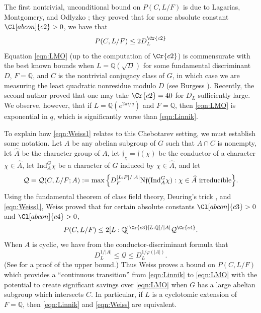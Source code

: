 \documentclass[12pt,psamsfonts]{amsart}
\theoremstyle{definition}
\theoremstyle{remark}
\numberwithin{equation}{section}
\newcounter{notation}
\theoremstyle{plain}
\theoremstyle{remark}
\renewcommand{\1}{ {\bf 1}}
\newcommand{\kf}{\mathfrak{f}}
\begin{document}
The first nontrivial, unconditional bound on $P(C,L/F)$ is due to Lagarias, Montgomery, and Odlyzko \cite{LMO}; they proved that for some absolute constant $\Cl[abcon]{c2}>0$, we have that
\begin{equation}
\label{eqn:LMO}
P(C,L/F)\leq 2D_L^{\Cr{c2}}
\end{equation}
Equation \eqref{eqn:LMO} (up to the computation of $\Cr{c2}$) is commensurate with the best known bounds when $L=\mathbb{Q}(\sqrt{D})$ for some fundamental discriminant $D$, $F=\mathbb{Q}$, and $C$ is the nontrivial conjugacy class of $G$, in which case we are measuring the least quadratic nonresidue modulo $D$ (see Burgess \cite{Burgess}).  %
Recently, the second author \cite{Zaman_2015c} proved that one may take $\Cr{c2}=40$ for $D_L$ sufficiently large.  We observe, however, that if $L=\mathbb{Q}(e^{2\pi i/q})$ and $F=\mathbb{Q}$, then \eqref{eqn:LMO} is exponential in $q$, which is significantly worse than \eqref{eqn:Linnik}.

To explain how \eqref{eqn:Weiss1} relates to this Chebotarev setting, we must establish some notation.  Let $A$ be any abelian subgroup of $G$ such that $A\cap C$ is nonempty, let $\widehat{A}$ be the character group of $A$, let $\kf_{\chi} = \mathfrak{f}(\chi)$ be the conductor of a character $\chi\in\widehat{A}$, let $\mathrm{Ind}_A^G \chi$ be a character of $\widehat{G}$ induced by $\chi\in\widehat{A}$, and let
\[
\mathcal{Q}=\mathcal{Q}(C,L/F;A):=\max\Big\{D_F^{[L:F]/|A|}\mathrm{N}\mathfrak{f}(\mathrm{Ind}_A^G\chi):\textup{$\chi\in\widehat{A}$ irreducible}\Big\}.
\]
Using the fundamental theorem of class field theory, Deuring's trick \cite{Deuring}, and \eqref{eqn:Weiss1}, Weiss \cite[Theorem 6.1]{Weiss} proved that for certain absolute constants $\Cl[abcon]{c3}>0$ and $\Cl[abcon]{c4}>0$, 
\begin{equation}
\label{eqn:Weiss}
P(C,L/F)\leq 2[L:\mathbb{Q}]^{\Cr{c3}[L:\mathbb{Q}]/|A|}\mathcal{Q}^{\Cr{c4}}.
\end{equation}
When $A$ is cyclic, we have from the conductor-discriminant formula that
\[
D_L^{1/|A|}\leq\mathcal{Q}\leq D_L^{1/\varphi(|A|)}.
\]
(See \cite[Chapter 5, Section 3]{Weiss_Thesis} for a proof of the upper bound.)  Thus Weiss proves a bound on $P(C,L/F)$ which provides a ``continuous transition'' from \eqref{eqn:Linnik} to \eqref{eqn:LMO} with the potential to create significant savings over \eqref{eqn:LMO} when $G$ has a large abelian subgroup which intersects $C$.  In particular, if $L$ is a cyclotomic extension of $F = \mathbb{Q}$, then \eqref{eqn:Linnik} and \eqref{eqn:Weiss} are equivalent.
\end{document}
